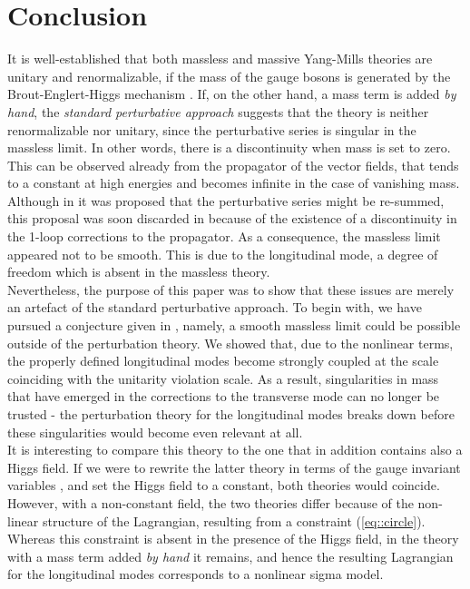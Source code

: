 \documentclass{article}
\begin{document}
\section{Conclusion}
It is well-established that both massless and massive Yang-Mills theories are unitary and renormalizable, if the mass of the gauge bosons is generated by the Brout-Englert-Higgs mechanism \cite{masslessYM, HiggsYM, Higgs1, Higgs2, EB }. If, on the other hand, a mass term is added \textit{by hand}, the \textit{standard perturbative approach} suggests that the theory is neither renormalizable nor unitary, since the perturbative series is singular in the massless limit. In other words, there is a discontinuity when mass is set to zero. This can be observed already from the propagator of the vector fields, that tends to a constant at high energies and becomes infinite in the case of vanishing mass. Although in \cite{Veltman1970} it was proposed that the perturbative series might be re-summed, this proposal was soon discarded in \cite{vDVZ} because of the existence of a discontinuity in the 1-loop corrections to the propagator.
As a consequence, the massless limit appeared not to be smooth.
This is due to the longitudinal mode, a degree of freedom which is absent in the massless theory. 
\\
Nevertheless, the purpose of this paper was to show that these issues are merely an artefact of the standard perturbative approach. To begin with, we have pursued a conjecture given in \cite{Vainshtein}, namely, a smooth massless limit could be possible outside of the perturbation theory. We showed that, due to the nonlinear terms, the properly defined longitudinal modes become strongly coupled at the scale coinciding with the unitarity violation scale. As a result, singularities in mass that have emerged in the corrections to the transverse mode can no longer be trusted - the perturbation theory for the longitudinal modes breaks down before these singularities would become even relevant at all.  
\\
It is interesting to compare this theory to the one that in addition  contains also a Higgs field. If we were to rewrite the latter theory in terms of the gauge invariant variables \cite{Cosmo}, and set the Higgs field to a constant, both theories would coincide. However, with a non-constant field, the two theories differ because of the non-linear structure of the Lagrangian, resulting from a constraint (\ref{eq::circle}). Whereas this constraint is absent in the presence of the Higgs field, in the theory with a mass term added \textit{by hand} it remains, and hence the resulting Lagrangian for the longitudinal modes corresponds to a nonlinear sigma model. 
\end{document}

